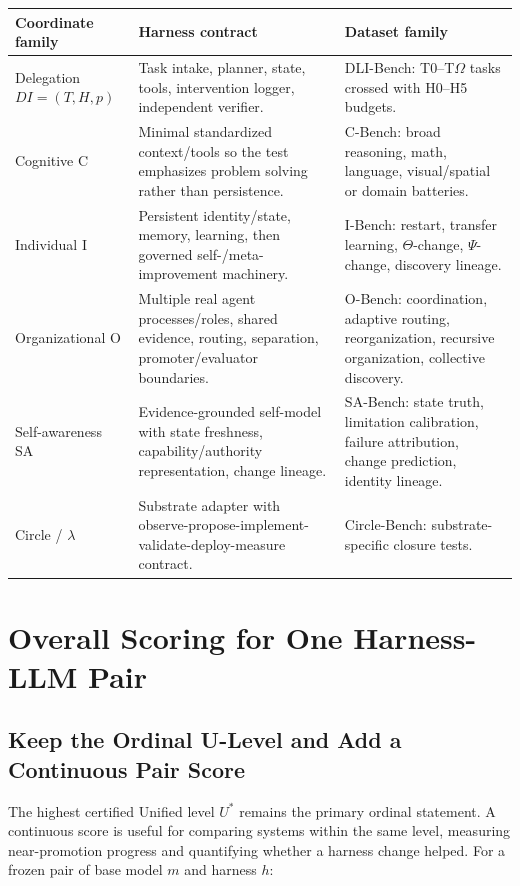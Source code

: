 \documentclass[11pt]{article}
\theoremstyle{definition}
\newcommand{\Om}{\ensuremath{\Omega}}
\begin{document}
\begin{table}[h]
\centering\small
\begin{tabularx}{\textwidth}{@{}lYY@{}}
\toprule
Coordinate family & Harness contract & Dataset family \\
\midrule
Delegation $DI=(T,H,p)$ & Task intake, planner, state, tools, intervention logger, independent verifier. & DLI-Bench: T0--T\Om{} tasks crossed with H0--H5 budgets. \\
Cognitive C & Minimal standardized context/tools so the test emphasizes problem solving rather than persistence. & C-Bench: broad reasoning, math, language, visual/spatial or domain batteries. \\
Individual I & Persistent identity/state, memory, learning, then governed self-/meta-improvement machinery. & I-Bench: restart, transfer learning, $\Theta$-change, $\Psi$-change, discovery lineage. \\
Organizational O & Multiple real agent processes/roles, shared evidence, routing, separation, promoter/evaluator boundaries. & O-Bench: coordination, adaptive routing, reorganization, recursive organization, collective discovery. \\
Self-awareness SA & Evidence-grounded self-model with state freshness, capability/authority representation, change lineage. & SA-Bench: state truth, limitation calibration, failure attribution, change prediction, identity lineage. \\
Circle / $\lambda$ & Substrate adapter with observe-propose-implement-validate-deploy-measure contract. & Circle-Bench: substrate-specific closure tests. \\
\bottomrule
\end{tabularx}
\end{table}

\section{Overall Scoring for One Harness-LLM Pair}

\subsection{Keep the Ordinal U-Level and Add a Continuous Pair Score}

The highest certified Unified level $U^{*}$ remains the primary ordinal statement. A continuous score is useful for comparing systems within the same level, measuring near-promotion progress and quantifying whether a harness change helped. For a frozen pair of base model $m$ and harness $h$:
\end{document}
